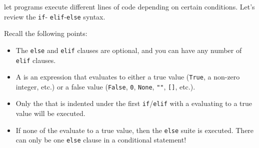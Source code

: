  let programs execute different lines of code
depending on certain conditions. Let's review the \texttt{if}-
\texttt{elif}-\texttt{else} syntax.

Recall the following points:
\begin{itemize}
    \item The \texttt{else} and \texttt{elif} clauses are optional, and you can have any number of \texttt{elif} clauses.
    \item A  is an expression that evaluates to either a true value (\texttt{True}, a non-zero integer, etc.) or a false value (\texttt{False}, \texttt{0}, \texttt{None}, \texttt{""}, \texttt{[]}, etc.).
    \item Only the  that is indented under the first
        \texttt{if}/\texttt{elif} with a 
        evaluating to a true value will be executed.
    \item If none of the  evaluate to a true
        value, then the \texttt{else} suite is executed. There can only be one
        \texttt{else} clause in a conditional statement!
        
\vspace{5}
\end{itemize}
